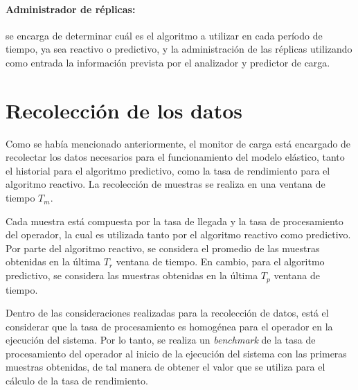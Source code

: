 \paragraph{Administrador de réplicas:} se encarga de determinar cuál es el algoritmo a utilizar en cada período de tiempo, ya sea reactivo o predictivo, y la administración de las réplicas utilizando como entrada la información prevista por el analizador y predictor de carga.


\section{Recolección de los datos}

Como se había mencionado anteriormente, el monitor de carga está encargado de recolectar los datos necesarios para el funcionamiento del modelo elástico, tanto el historial para el algoritmo predictivo, como la tasa de rendimiento para el algoritmo reactivo. La recolección de muestras se realiza en una ventana de tiempo $T_m$.


\normalsize{Cada muestra está compuesta por la tasa de llegada y la tasa de procesamiento del operador, la cual es utilizada tanto por el algoritmo reactivo como predictivo. Por parte del algoritmo reactivo, se considera el promedio de las muestras obtenidas en  la última $T_r$ ventana de tiempo. En cambio, para el algoritmo predictivo, se considera las muestras obtenidas en la última $T_p$ ventana de tiempo.

Dentro de las consideraciones realizadas para la recolección de datos, está el considerar que la tasa de procesamiento es homogénea para el operador en la ejecución del sistema. Por lo tanto, se realiza un \textit{benchmark} de la tasa de procesamiento del operador al inicio de la ejecución del sistema con las primeras muestras obtenidas, de tal manera de obtener el valor que se utiliza para el cálculo de la tasa de rendimiento.}


